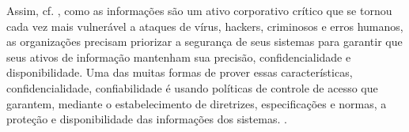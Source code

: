 Assim, cf. , como as informações são um ativo corporativo crítico que se tornou cada vez mais vulnerável a ataques de vírus, hackers, criminosos e erros humanos, as organizações precisam priorizar a segurança de seus sistemas para garantir que seus ativos de informação mantenham sua precisão, confidencialidade e disponibilidade. Uma das muitas formas de prover essas características, confidencialidade, confiabilidade é usando políticas de controle de acesso que garantem, mediante o estabelecimento de diretrizes, especificações e normas, a proteção e disponibilidade das informações dos sistemas. \cite{bellettini_role_2001} \cite{ueda_tese_2012}.






